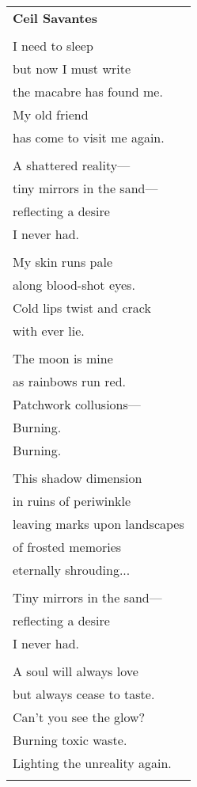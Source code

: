 \documentclass{article}
\begin{document}
\begin{center}
\begin{tabular}{l}
\textbf{Ceil Savantes} \\ %
\\
I need to sleep \\
but now I must write \\
the macabre has found me. \\
My old friend \\
has come to visit me again. \\
\\
A shattered reality--- \\
tiny mirrors in the sand--- \\
reflecting a desire \\
I never had. \\
\\
My skin runs pale \\
along blood-shot eyes. \\
Cold lips twist and crack \\
with ever lie. \\
\\
The moon is mine \\
as rainbows run red. \\
Patchwork collusions--- \\
Burning. \\
Burning. \\
\\
This shadow dimension \\
in ruins of periwinkle \\
leaving marks upon landscapes \\
of frosted memories \\
eternally shrouding... \\
\\
Tiny mirrors in the sand--- \\
reflecting a desire \\
I never had. \\
\\
A soul will always love \\
but always cease to taste. \\
Can't you see the glow? \\
Burning toxic waste. \\
Lighting the unreality again. \\
\\
\end{tabular}

\end{center}
\end{document}
